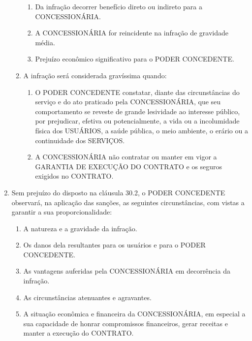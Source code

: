 \documentclass[a4paper,11pt]{report} %
\begin{document}
\begin{enumerate}
\begin{enumerate}[label*=\arabic*.]
\begin{enumerate}[label*=\arabic*.]
\item \label{itm:9RTQ} Da infração decorrer benefício direto ou indireto para a CONCESSIONÁRIA.

\item \label{itm:NYBC} A CONCESSIONÁRIA for reincidente na infração de gravidade média.

\item \label{itm:Q2FG} Prejuízo econômico significativo para o PODER CONCEDENTE.
\end{enumerate}

\item \label{itm:EZQF} A infração será considerada gravíssima quando:

\begin{enumerate}[label*=\arabic*.]
\item \label{itm:PNVN} O PODER CONCEDENTE constatar, diante das circunstâncias do serviço e do ato praticado pela CONCESSIONÁRIA, que seu comportamento se reveste de grande lesividade ao interesse público, por prejudicar, efetiva ou potencialmente, a vida ou a incolumidade física dos USUÁRIOS, a saúde pública, o meio ambiente, o erário ou a continuidade dos SERVIÇOS.

\item \label{itm:2DZM} A CONCESSIONÁRIA não contratar ou manter em vigor a GARANTIA DE EXECUÇÃO DO CONTRATO e os seguros exigidos no CONTRATO.
\end{enumerate}
\end{enumerate}

\item \label{itm:C3RM} Sem prejuízo do disposto na cláusula 30.2, o PODER CONCEDENTE observará, na aplicação das sanções, as seguintes circunstâncias, com vistas a garantir a sua proporcionalidade:

\begin{enumerate}[label*=\arabic*.]
\item \label{itm:FQ3J} A natureza e a gravidade da infração.

\item \label{itm:RMHT} Os danos dela resultantes para os usuários e para o PODER CONCEDENTE.

\item \label{itm:X27X} As vantagens auferidas pela CONCESSIONÁRIA em decorrência da infração.

\item \label{itm:JXV8} As circunstâncias atenuantes e agravantes.

\item \label{itm:6LVU} A situação econômica e financeira da CONCESSIONÁRIA, em especial a sua capacidade de honrar compromissos financeiros, gerar receitas e manter a execução do CONTRATO.


\end{enumerate}
\end{enumerate}
\end{document}
